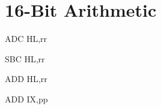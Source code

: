 \section{16-Bit Arithmetic}

\begin{minipage}{\textwidth}

\begin{instrtable}

	\begin{instruction}{ADC HL,rr} 
			\FlagsADCrr
		\SkipToOpCode
	\end{instruction}

	\begin{instruction}{SBC HL,rr} 
			\FlagsSBCrr
		\SkipToOpCode
	\end{instruction}

	\begin{instruction}{ADD HL,rr} 
			\FlagsADDrr
	\end{instruction}

	\begin{instruction}{ADD IX,pp} 
			\FlagsADDrr
		\SkipToOpCode
	\end{instruction}


\end{instrtable}
\end{minipage}
